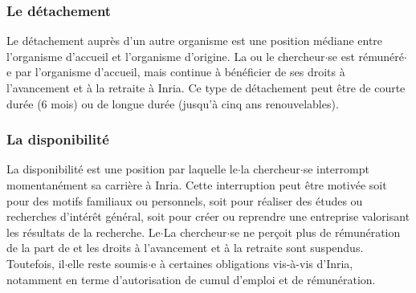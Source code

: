 \subsubsection{Le d\'etachement}
Le d\'etachement aupr\`es d'un autre organisme est une position
m\'ediane entre l'organisme d'accueil et l'organisme d'origine. La ou le
chercheur$\cdot$se est r\'emun\'er\'e$\cdot$e par l'organisme d'accueil, mais continue \`a
b\'en\'eficier de ses droits \`a l'avancement et \`a la retraite \`a
Inria. Ce type de d\'etachement peut \^etre de courte dur\'ee (6
mois) ou de longue dur\'ee (jusqu'\`a cinq ans renouvelables).

\subsubsection{La disponibilit\'e}
La disponibilit\'e est une position par laquelle le$\cdot$la chercheur$\cdot$se
interrompt momentan\'ement sa carri\`ere \`a Inria. Cette interruption
peut \^etre motiv\'ee soit pour des motifs familiaux ou personnels, soit
pour r\'ealiser des \'etudes ou recherches d'int\'er\^et g\'en\'eral,
soit pour cr\'eer ou reprendre une entreprise valorisant les
r\'esultats de la recherche. Le$\cdot$La chercheur$\cdot$se ne per\c coit plus de
r\'emun\'eration de la part de  et les droits \`a l'avancement
et \`a la retraite sont suspendus. Toutefois, il$\cdot$elle reste soumis$\cdot$e \`a
certaines obligations vis-\`a-vis d'Inria, notamment en terme
d'autorisation de cumul d'emploi et de r\'emun\'eration.
